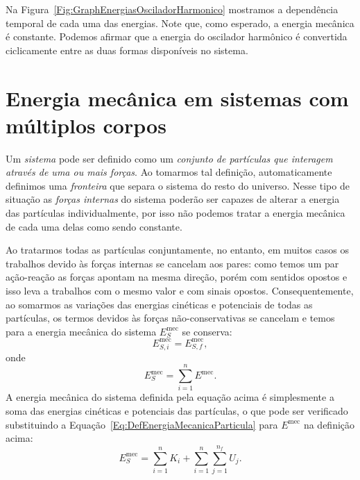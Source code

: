 Na Figura~\ref{Fig:GraphEnergiasOsciladorHarmonico} mostramos a dependência temporal de cada uma das energias. Note que, como esperado, a energia mecânica é constante. Podemos afirmar que a energia do oscilador harmônico é convertida ciclicamente entre as duas formas disponíveis no sistema.



\section{Energia mecânica em sistemas com múltiplos corpos}
\label{Sec:Sistemas}

Um \emph{sistema} pode ser definido como um \emph{conjunto de partículas que interagem através de uma ou mais forças}. Ao tomarmos tal definição, automaticamente definimos uma \emph{fronteira} que separa o sistema do resto do universo. Nesse tipo de situação as \emph{forças internas} do sistema poderão ser capazes de alterar a energia das partículas individualmente, por isso não podemos tratar a energia mecânica de cada uma delas como sendo constante.

Ao tratarmos todas as partículas conjuntamente, no entanto, em muitos casos os trabalhos devido às forças internas se cancelam aos pares: como temos um par ação-reação as forças apontam na mesma direção, porém com sentidos opostos e isso leva a trabalhos com o mesmo valor e com sinais opostos. Consequentemente, ao somarmos as variações das energias cinéticas e potenciais de todas as partículas, os termos devidos às forças não-conservativas se cancelam e temos para a energia mecânica do sistema $E_S^{\text{mec}}$ se conserva:
\begin{equation}
    E_{S,i}^{\text{mec}} = E_{S,f}^{\text{mec}},
\end{equation}
%
onde
\begin{equation}
    E_S^{\text{mec}} = \sum_{i = 1}^{n} E^{\text{mec}}.
\end{equation}
%
A energia mecânica do sistema definida pela equação acima é simplesmente a soma das energias cinéticas e potenciais das partículas, o que pode ser verificado substituindo a Equação~\ref{Eq:DefEnergiaMecanicaParticula} para $E^{\text{mec}}$ na definição acima:
\begin{equation}
    E_S^{\text{mec}} = \sum_{i = 1}^{n} K_i + \sum_{i = 1}^n \sum_{j = 1}^{n_f} U_j.
\end{equation}

